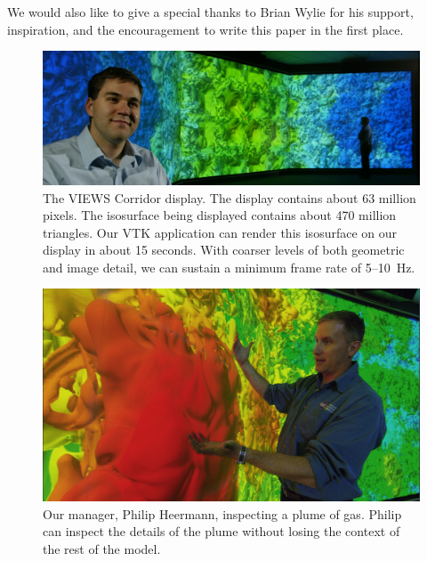 \documentclass[letterpaper]{acmsiggraph}
\newcommand{\sticky}[1]{}
\begin{document}
  We would also like to give a special thanks to Brian Wylie for his
  support, inspiration, and the encouragement to write this paper in the
  first place.


  
  

  \begin{figure}[!p]
    \includegraphics[width=\textwidth]{images/FullWall}
    \caption{The VIEWS Corridor display.  The display contains about 63
    million pixels.  The isosurface being displayed contains about 470
    million triangles.  Our VTK application can render this isosurface on
    our display in about 15 seconds.  With coarser levels of both geometric
    and image detail, we can sustain a minimum frame rate of 5--10~Hz.
    \sticky{Might want to verify that.}}
    \label{fig:fullwall}
  \end{figure}

  \begin{figure}[!p]
    \includegraphics[width=\textwidth]{images/PhilwBlob}
    \caption{Our manager, Philip Heermann, inspecting a plume of gas.
    Philip can inspect the details of the plume without losing the context
    of the rest of the model.}
    \label{fig:philwblob}
  \end{figure}
\end{document}
